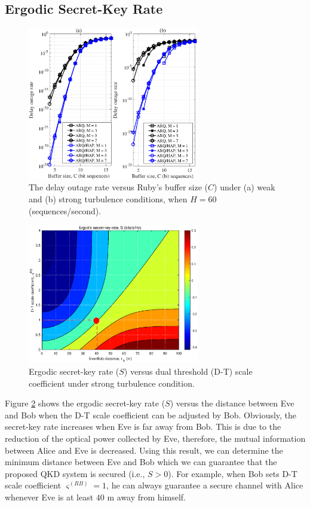 \documentclass[conference]{IEEEtran}
\begin{document}
\subsection{Ergodic Secret-Key Rate}
\begin{figure}[t]
\begin{center}
\includegraphics[width=7.5cm]{Figures/Figure5.eps}
\end{center}
\caption{The delay outage rate versus Ruby's buffer size ($C$) under (a) weak and (b) strong turbulence conditions, when $H=60$ (sequences/second).}
\label{fig:DelayOutageRate_BufferSize}
\end{figure} 

\begin{figure}[t]
\begin{center}
\includegraphics[width=7.5cm]{Figures/Figure6.eps}
\end{center}
\caption{Ergodic secret-key rate ($S$) versus dual threshold (D-T) scale coefficient under strong turbulence condition.}
\label{fig:ErgodicSecretKeyRate}
\end{figure}

Figure \ref{fig:ErgodicSecretKeyRate} shows the ergodic secret-key rate ($S$) versus the distance between Eve and Bob when the D-T scale coefficient can be adjusted by Bob. Obviously, the secret-key rate increases when Eve is far away from Bob. This is due to the reduction of the optical power collected by Eve, therefore, the mutual information between Alice and Eve is decreased. Using this result, we can determine the minimum distance between Eve and Bob which we can guarantee that the proposed QKD system is secured (i.e., $S>0$). For example, when Bob sets D-T scale coefficient $\varsigma^{(RB)}=1$, he can always guarantee a secure channel with Alice whenever Eve is at least $40$ m away from himself.
\end{document}
